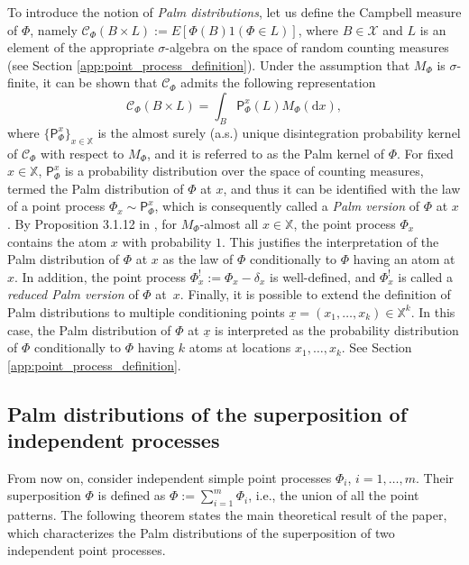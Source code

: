 \documentclass[11pt,a4paper,oneside]{article}
\newcommand{\indicator}{\ensuremath{{1}}}
\newcommand{\dd}{\mathrm d}
\newcommand{\plaw}{\mathsf{P}}
\newcommand{\E}{E}
\newcommand{\Xcr}{\mathscr{X}}
\newcommand{\X}{\mathbb{X}}
\theoremstyle{definition}
\theoremstyle{remark}
\begin{document}
To introduce the notion of \emph{Palm distributions}, let us define the Campbell measure of $\Phi$, namely $\mathscr C_{\Phi}(B \times L) := \E[\Phi(B) \indicator(\Phi \in L)]$, where  $B \in \Xcr$ and  $L$ is an element of the appropriate $\sigma$-algebra on the space of random counting measures (see Section \ref{app:point_process_definition}).
Under the assumption that $M_\Phi$ is $\sigma$-finite, it can be shown that $\mathscr C_{\Phi}$ admits the following representation
\[
   \mathscr C_{\Phi}(B \times L) = \int_B \plaw_{\Phi}^x(L) M_\Phi(\dd x),
\]
where $\{\plaw_{\Phi}^x\}_{x \in \X}$ is the almost surely (a.s.) unique disintegration probability kernel of $\mathscr C_\Phi$ with respect to $M_\Phi$, and it is referred to as the Palm kernel of $\Phi$.
For fixed $x \in \X$, $\plaw_{\Phi}^x$ is a probability distribution over the space of counting measures, termed the Palm distribution of $\Phi$ at $x$, and thus it can be identified with the law of a point process $\Phi_x \sim \plaw_{\Phi}^x$, which is consequently called a \emph{Palm version} of $\Phi$ at $x$. By Proposition 3.1.12 in \cite{BaBlaKa},  for $M_\Phi$-almost all $x \in \X$, the point process $\Phi_x$ contains the atom $x$ with probability $1$. This justifies the interpretation of the Palm distribution of $\Phi$ at $x$ as the law of $\Phi$ conditionally to $\Phi$ having an atom at $x$. In addition, the point process $\Phi^!_x := \Phi_x - \delta_x$ is well-defined, and $\Phi^!_x$ is called a \emph{reduced Palm version} of $\Phi$ at~$x$. 
Finally, it is possible to extend the definition of Palm distributions to multiple conditioning points $\underline{x} = (x_1, \ldots, x_k) \in \X^k$. In this case, the Palm distribution of $\Phi$ at $\underline x$ is interpreted as the probability distribution of $\Phi$ conditionally to $\Phi$ having $k$ atoms at locations $x_1, \ldots, x_k$. See Section \ref{app:point_process_definition}.


\subsection{Palm distributions of the superposition of independent processes} \label{sec:main}


From now on, consider independent simple point processes $\Phi_i$, $i = 1, \ldots, m$. Their superposition $\Phi$ is defined as
$\Phi := \sum_{i= 1}^m  \Phi_i$, i.e., the union of all the point patterns. 
The following theorem states the main theoretical result of the paper, which characterizes the Palm distributions of the superposition of two independent point processes.  
\end{document}
